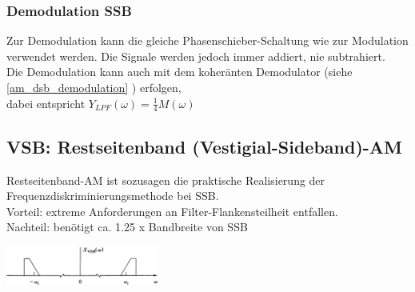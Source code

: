 \subsubsection{Demodulation SSB}
Zur Demodulation kann die gleiche Phasenschieber-Schaltung wie zur Modulation verwendet
werden. Die Signale werden jedoch immer addiert, nie subtrahiert. \\
Die Demodulation kann auch mit dem koheränten Demodulator (siehe \ref{am_dsb_demodulation} ) erfolgen,\\
 dabei entspricht $Y_{LPF}(\omega) = \frac{1}{4}M(\omega)$ \\


\subsection{VSB: Restseitenband (Vestigial-Sideband)-AM}
	\begin{minipage}{12cm}
		Restseitenband-AM ist sozusagen die praktische Realisierung der Frequenzdiskriminierungsmethode bei
		SSB. \\
		Vorteil: extreme Anforderungen an Filter-Flankensteilheit entfallen.\\
		Nachteil: ben\"otigt ca. 1.25 x Bandbreite von SSB
	\end{minipage}
	\begin{minipage}{5cm}
		\begin{center}
		    \includegraphics[width=5cm]{bilder/am_vsb_spektrum.png}
		\end{center}
	\end{minipage}
	
